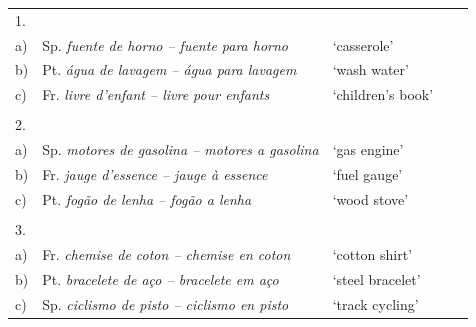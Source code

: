 \documentclass[output=paper]{langsci/langscibook}
\begin{document}
  
 \begin{tabular}{lllll}
 
1. &  &  &  \\ 
 
a) & Sp. \textit{fuente de horno – fuente para horno}  & `casserole' \\ 
 
b) & Pt. \textit{água de lavagem – água para lavagem}    & `wash water' \\ 

c) & Fr. \textit{livre d'enfant – livre pour enfants}   & `children’s book' \\ 
 \\
2. &  &  &  \\ 

a) & Sp. \textit{motores de gasolina – motores a gasolina}   & `gas engine' \\ 
 
b) & Fr. \textit{jauge d'essence – jauge à essence}  & `fuel gauge' \\ 

c) & Pt. \textit{fogão de lenha – fogão a lenha}  & `wood stove' \\ 
 \\
3. &  &  &  \\ 

a) & Fr. \textit{chemise de coton – chemise en coton}  & `cotton shirt' \\ 
 
b) & Pt. \textit{bracelete de aço – bracelete em aço} & `steel bracelet' \\ 

c) & Sp. \textit{ciclismo de pisto – ciclismo en pisto}  & `track cycling' \\ 
 
\end{tabular} \\
 
\end{document}

